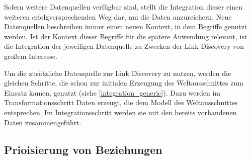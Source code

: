 Sofern weitere Datenquellen verfügbar sind, stellt die Integration dieser einen weiteren erfolgversprechenden Weg dar, um die Daten anzureichern. Neue Datenquellen beschreiben immer einen neuen Kontext, in dem Begriffe genutzt werden. Ist der Kontext dieser Begriffe für die spätere Anwendung relevant, ist die Integration der jeweiligen Datenquelle zu Zwecken der Link Discovery von großem Interesse.

Um die zusätzliche Datenquelle zur Link Discovery zu nutzen, werden die gleichen Schritte, die schon zur initialen Erzeugung des Weltausschnittes zum Einsatz kamen, genutzt (siehe \ref{integration_generic}). Dazu werden im Transformationsschritt Daten erzeugt, die dem Modell des Weltausschnittes entsprechen. Im Integrationsschritt werden sie mit den bereits vorhandenen Daten zusammengeführt.

\subsection{Prioisierung von Beziehungen}